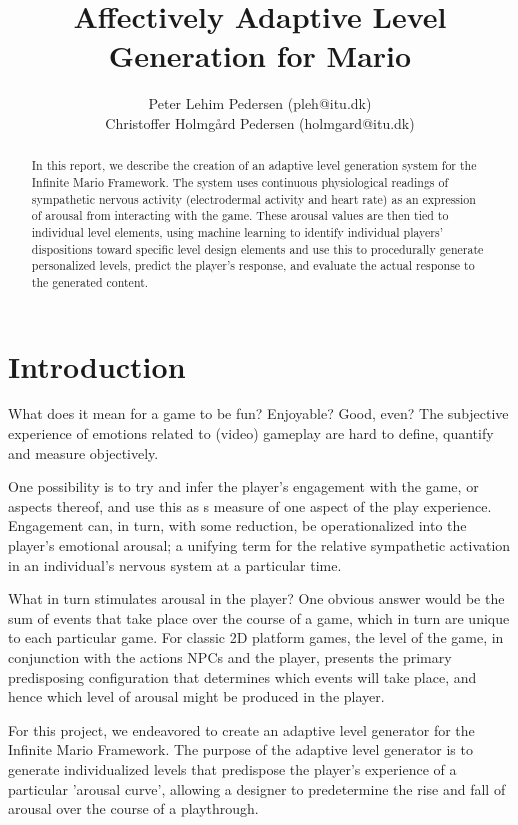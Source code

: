 \documentclass{llncs}
\begin{document}
\title{Affectively Adaptive Level Generation for Mario}
\author{Peter Lehim Pedersen (pleh@itu.dk) \\Christoffer Holmg{\aa}rd Pedersen (holmgard@itu.dk)}
\maketitle
\begin{abstract}
In this report, we describe the creation of an adaptive level generation system for the Infinite Mario Framework.
The system uses continuous physiological readings of sympathetic nervous activity (electrodermal activity and heart rate) as an expression of arousal from interacting with the game.
These arousal values are then tied to individual level elements, using machine learning to identify individual players' dispositions toward specific level design elements and use this to procedurally generate personalized levels, predict the player's response, and evaluate the actual response to the generated content.
\end{abstract}
\section{Introduction}
What does it mean for a game to be fun? Enjoyable? Good, even? The subjective experience of emotions related to (video) gameplay are hard to define, quantify and measure objectively.

One possibility is to try and infer the player's engagement with the game, or aspects thereof, and use this as s measure of one aspect of the play experience.
Engagement can, in turn, with some reduction, be operationalized into the player's emotional arousal; a unifying term for the relative sympathetic activation in an individual's nervous system at a particular time\cite{picard1997affective}.

What in turn stimulates arousal in the player? One obvious answer would be the sum of events that take place over the course of a game, which in turn are unique to each particular game\cite{ravaja2005psychophysiology}. For classic 2D platform games, the level of the game, in conjunction with the actions NPCs and the player, presents the primary predisposing configuration that determines which events will take place, and hence which level of arousal might be produced in the player.\cite{asteriadis2012towards}

For this project, we endeavored to create an adaptive level generator for the Infinite Mario Framework. The purpose of the adaptive level generator is to generate individualized levels that predispose the player's experience of a particular 'arousal curve', allowing a designer to predetermine the rise and fall of arousal over the course of a playthrough.
\end{document}
